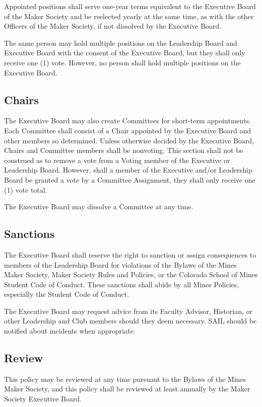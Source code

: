 \documentclass[12pt,letterpaper]{article}
\begin{document}
Appointed positions shall serve one-year terms equivalent to the Executive Board of the Maker Society and be reelected yearly at the same time, as with the other Officers of the Maker Society, if not dissolved by the Executive Board.

The same person may hold multiple positions on the Leadership Board and Executive Board with the consent of the Executive Board, but they shall only receive one (1) vote. However, no person shall hold multiple positions on the Executive Board.

\subsection{Chairs}
The Executive Board may also create Committees for short-term appointments. Each Committee shall consist of a Chair appointed by the Executive Board and other members so determined. Unless otherwise decided by the Executive Board, Chairs and Committee members shall be nonvoting. This section shall not be construed as to remove a vote from a Voting member of the Executive or Leadership Board. However, shall a member of the Executive and/or Leadership Board be granted a vote by a Committee Assignment, they shall only receive one (1) vote total.

The Executive Board may dissolve a Committee at any time.

\subsection{Sanctions}

The Executive Board shall reserve the right to sanction or assign consequences to members of the Leadership Board for violations of the Bylaws of the Mines Maker Society, Maker Society Rules and Policies, or the Colorado School of Mines Student Code of Conduct. These sanctions shall abide by all Mines Policies, especially the Student Code of Conduct.

The Executive Board may request advice from its Faculty Advisor, Historian, or other Leadership and Club members should they deem necessary. SAIL should be notified about incidents when appropriate.

\subsection{Review}

This policy may be reviewed at any time pursuant to the Bylaws of the Mines Maker Society, and this policy shall be reviewed at least annually by the Maker Society Executive Board.
\end{document}
